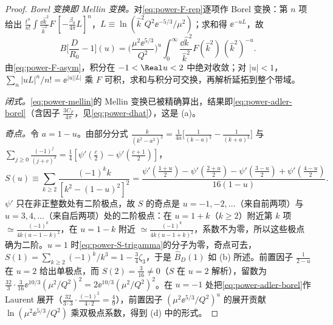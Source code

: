 \begin{proof}
\emph{Borel 变换即 Mellin 变换。}对\eqref{eq:power-F-rep}逐项作 Borel 变换：第 $n$ 项给出 $\frac{t^n}{n!}\int\frac{\dd\hat k^2}{\hat k^2}F\,[-\frac{\beta_0}{4\pi}L]^n$，$L\equiv\ln(\hat k^2Q^2\ee^{-5/3}/\mu^2)$；求和得 $\ee^{-uL}$，故
\begin{equation}\label{eq:power-mellin}
B\Big[\frac{D}{R_0}-1\Big](u)=\Big(\frac{\mu^2\ee^{5/3}}{Q^2}\Big)^u\int_0^\infty\frac{\dd\hat k^2}{\hat k^2}F(\hat k^2)\,(\hat k^2)^{-u}.
\end{equation}
由\eqref{eq:power-F-asym}，积分在 $-1<\Real u<2$ 中绝对收敛；对 $|u|<1$，$\sum_n|uL|^n/n!=\ee^{|u||L|}$ 乘 $F$ 可积，求和与积分可交换，再解析延拓到整个带域。

\emph{闭式。}\eqref{eq:power-mellin}的 Mellin 变换已被精确算出，结果即\eqref{eq:power-adler-borel}（含因子 $\frac{3C_F}{4\pi}$，见\eqref{eq:power-dhat}）\cite{Beneke1993,Broadhurst1993,Beneke1999}，这是 (a)。

\emph{奇点。}令 $a=1-u$。由部分分式 $\frac{k}{(k^2-a^2)^2}=\frac1{4a}\big[\frac{1}{(k-a)^2}-\frac{1}{(k+a)^2}\big]$ 与 $\sum_{j\ge0}\frac{(-1)^j}{(j+c)^2}=\frac14[\psi'(\frac c2)-\psi'(\frac{c+1}2)]$，
\begin{equation}\label{eq:power-S-trigamma}
S(u)\equiv\sum_{k\ge2}\frac{(-1)^kk}{[k^2-(1-u)^2]^2}=\frac{\psi'(\frac{1+u}2)-\psi'(\frac{2+u}2)-\psi'(\frac{3-u}2)+\psi'(\frac{4-u}2)}{16(1-u)}.
\end{equation}
$\psi'$ 只在非正整数处有二阶极点，故 $S$ 的奇点是 $u=-1,-2,\dots$（来自前两项）与 $u=3,4,\dots$（来自后两项）处的二阶极点：在 $u=1+k$（$k\ge2$）附近第 $k$ 项 $\simeq\frac{(-1)^k}{4k(u-1-k)^2}$，在 $u=1-k$ 附近 $\simeq\frac{(-1)^k}{4k(u-1+k)^2}$，系数不为零，所以这些极点确为二阶。$u=1$ 时\eqref{eq:power-S-trigamma}的分子为零，奇点可去，$S(1)=\sum_{k\ge2}(-1)^k/k^3=1-\frac34\zeta_3$，于是 $\hat B_D(1)$ 如 (b) 所述。前置因子 $\frac{1}{2-u}$ 在 $u=2$ 给出单极点，而 $S(2)=\frac3{16}\ne0$（$S$ 在 $u=2$ 解析），留数为 $\frac{32}{3}\cdot\frac{3}{16}\ee^{10/3}(\mu^2/Q^2)^2=2\ee^{10/3}(\mu^2/Q^2)^2$。在 $u=-1$ 处把\eqref{eq:power-adler-borel}作 Laurent 展开（$\frac{32}{3\cdot3}\cdot\frac{(-1)^2}{4\cdot2}=\frac49$），前置因子 $(\mu^2\ee^{5/3}/Q^2)^u$ 的展开贡献 $\ln(\mu^2\ee^{5/3}/Q^2)$ 乘双极点系数，得到 (d) 中的形式。


\end{proof}
